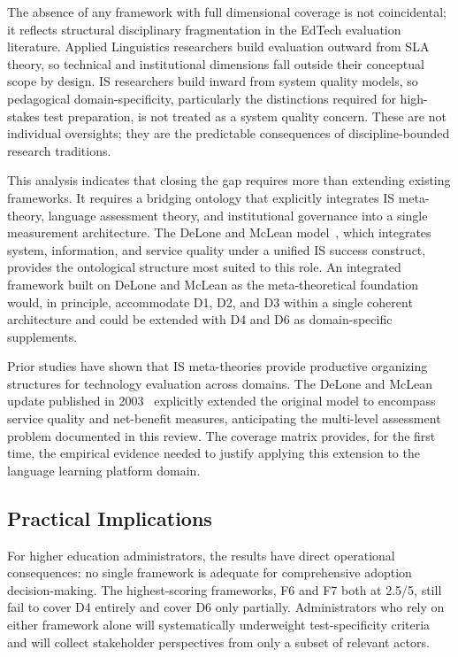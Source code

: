 \documentclass[conference]{IEEEtran}
\begin{document}
The absence of any framework with full dimensional coverage is not
coincidental; it reflects structural disciplinary fragmentation in the
EdTech evaluation literature. Applied Linguistics researchers build
evaluation outward from SLA theory, so technical and institutional
dimensions fall outside their conceptual scope by design. IS
researchers build inward from system quality models, so
pedagogical domain-specificity, particularly the distinctions required
for high-stakes test preparation, is not treated as a system quality
concern. These are not individual oversights; they are the predictable
consequences of discipline-bounded research traditions.

This analysis indicates that closing the gap requires more than
extending existing frameworks. It requires a bridging ontology that
explicitly integrates IS meta-theory, language assessment theory, and
institutional governance into a single measurement architecture.
The DeLone and McLean model~\cite{b10}, which integrates system,
information, and service quality under a unified IS success construct,
provides the ontological structure most suited to this role. An
integrated framework built on DeLone and McLean as the meta-theoretical
foundation would, in principle, accommodate D1, D2, and D3 within a
single coherent architecture and could be extended with D4 and D6 as
domain-specific supplements.

Prior studies have shown that IS meta-theories provide productive
organizing structures for technology evaluation across domains. The
DeLone and McLean update published in 2003~\cite{b10} explicitly
extended the original model to encompass service quality and
net-benefit measures, anticipating the multi-level assessment problem
documented in this review. The coverage matrix provides, for the first
time, the empirical evidence needed to justify applying this extension
to the language learning platform domain.

\subsection{Practical Implications}

For higher education administrators, the results have direct operational
consequences: no single framework is adequate for comprehensive adoption
decision-making. The highest-scoring frameworks, F6 and F7 both at
2.5/5, still fail to cover D4 entirely and cover D6 only partially.
Administrators who rely on either framework alone will systematically
underweight test-specificity criteria and will collect stakeholder
perspectives from only a subset of relevant actors.
\end{document}
